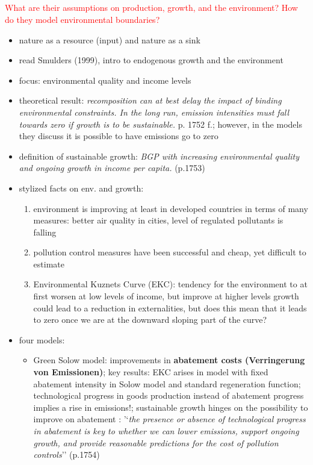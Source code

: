 \documentclass[12pt]{article}
\newcommand{\tr}[1]{\textcolor{red}{#1}}
\begin{document}
\subsection{\cite{Brock2005ChapterEmpirics}}
\tr{What are their assumptions on production, growth, and the environment? How do they model environmental boundaries? }
\begin{itemize}
	\item nature as a resource (input) and nature as a sink
\item read Smulders (1999), intro to endogenous growth and the environment
\item focus: environmental quality and income levels
\item theoretical result:\textit{ recomposition can at best delay the impact of binding environmental constraints. In the long run, emission intensities must fall towards zero if growth is to be sustainable. } p. 1752 f.; however, in the models they discuss it is possible to have emissions go to zero
\item definition of sustainable growth: \textit{BGP with increasing environmental quality and ongoing growth in income per capita.} (p.1753)
\item stylized facts on env. and growth:
\begin{enumerate}
\item environment is improving at least in developed countries in terms of many measures: better air quality in cities, level of regulated pollutants is falling
\item pollution control measures have been successful and cheap, yet difficult to estimate
\item Environmental Kuznets  Curve (EKC): tendency for the environment to at first worsen at low levels of income, but improve at higher levels \textcolor{sonja}{growth could lead to a reduction in externalities, but does this mean that it leads to zero once we are at the downward sloping part of the curve?}
\end{enumerate}
\item four models: 
\begin{itemize}
	\item Green Solow model: improvements in \textbf{abatement costs (Verringerung von Emissionen)}; key results: EKC arises in model with fixed abatement intensity in Solow model and standard regeneration function; technological progress in goods production instead of abatement progress implies a rise in emissions!; sustainable growth hinges on the possibility to improve on abatement : '`\textit{the presence or absence of technological progress in abatement is key to whether we can lower emissions, support ongoing growth, and provide reasonable predictions for the cost of pollution controls}'' (p.1754)

\end{itemize}
\end{itemize}
\end{document}
